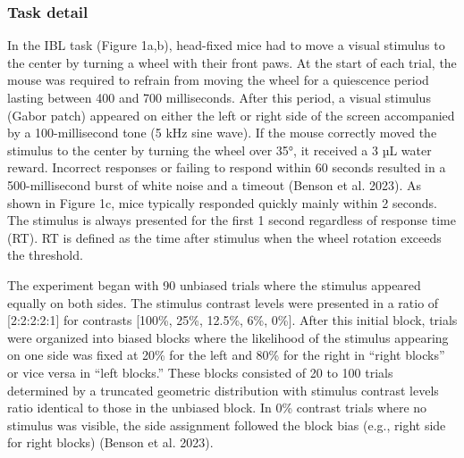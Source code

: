 \documentclass[
  letterpaper,
  DIV=11,
  numbers=noendperiod]{scrartcl}
\begin{document}
\subsubsection{Task detail}\label{task-detail}

In the IBL task (Figure 1a,b), head-fixed mice had to move a visual
stimulus to the center by turning a wheel with their front paws. At the
start of each trial, the mouse was required to refrain from moving the
wheel for a quiescence period lasting between 400 and 700 milliseconds.
After this period, a visual stimulus (Gabor patch) appeared on either
the left or right side of the screen accompanied by a 100-millisecond
tone (5 kHz sine wave). If the mouse correctly moved the stimulus to the
center by turning the wheel over 35°, it received a 3 µL water reward.
Incorrect responses or failing to respond within 60 seconds resulted in
a 500-millisecond burst of white noise and a timeout (Benson et al.
2023). As shown in Figure 1c, mice typically responded quickly mainly
within 2 seconds. The stimulus is always presented for the first 1
second regardless of response time (RT). RT is defined as the time after
stimulus when the wheel rotation exceeds the threshold.

The experiment began with 90 unbiased trials where the stimulus appeared
equally on both sides. The stimulus contrast levels were presented in a
ratio of {[}2:2:2:2:1{]} for contrasts {[}100\%, 25\%, 12.5\%, 6\%,
0\%{]}. After this initial block, trials were organized into biased
blocks where the likelihood of the stimulus appearing on one side was
fixed at 20\% for the left and 80\% for the right in ``right blocks'' or
vice versa in ``left blocks.'' These blocks consisted of 20 to 100
trials determined by a truncated geometric distribution with stimulus
contrast levels ratio identical to those in the unbiased block. In 0\%
contrast trials where no stimulus was visible, the side assignment
followed the block bias (e.g., right side for right blocks) (Benson et
al. 2023).
\end{document}

